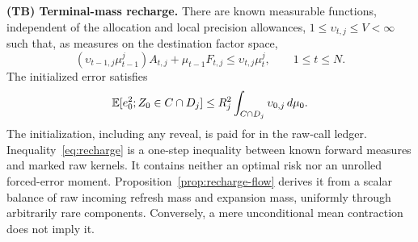 \smallskip\noindent\textbf{(TB) Terminal-mass recharge.}
There are known measurable functions, independent of the allocation and local precision allowances, $1\le \upsilon_{t,j}\le V<\infty$ such that, as measures on the destination factor space,
\begin{equation}\label{eq:recharge}
 (\upsilon_{t-1,j}\mu_{t-1}^j)A_{t,j}+\mu_{t-1}F_{t,j}
       \le \upsilon_{t,j}\mu_t^j,\qquad 1\le t\le N.
\end{equation}
The initialized error satisfies
\begin{equation}\label{eq:bridge-seed}
 \mathbb E[e_0^2;Z_0\in C\cap D_j]\le R_j^2\int_{C\cap D_j}\upsilon_{0,j}\,d\mu_0.
\end{equation}
The initialization, including any reveal, is paid for in the raw-call ledger. Inequality~\eqref{eq:recharge} is a one-step inequality between known forward measures and marked raw kernels. It contains neither an optimal risk nor an unrolled forced-error moment. Proposition~\ref{prop:recharge-flow} derives it from a scalar balance of raw incoming refresh mass and expansion mass, uniformly through arbitrarily rare components. Conversely, a mere unconditional mean contraction does not imply it.

